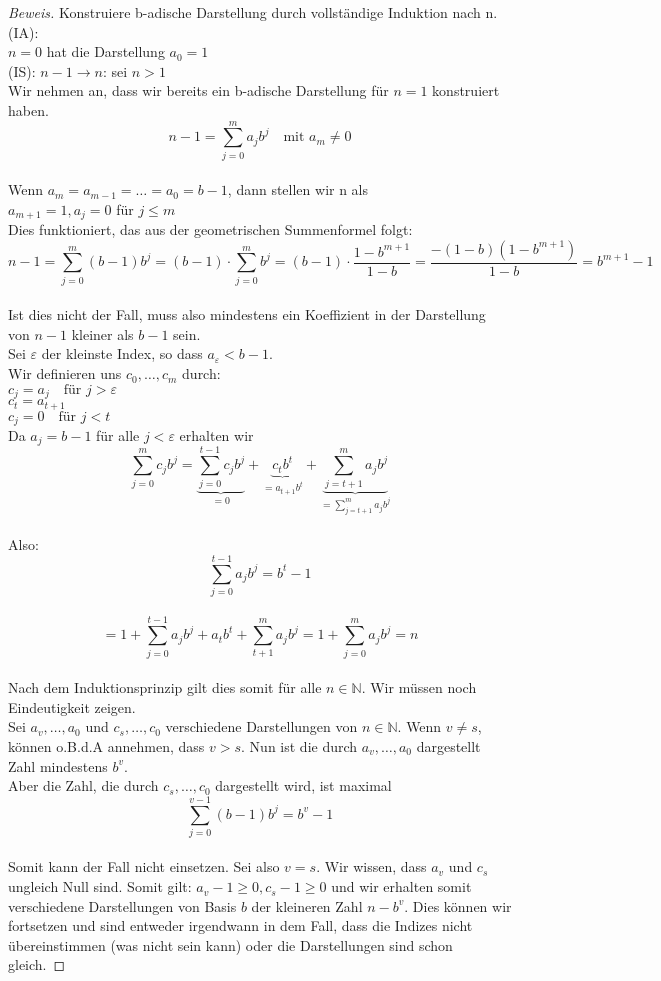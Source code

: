 \documentclass[12pt,a4paper,titlepage]{article} %
\theoremstyle{definition}
\theoremstyle{remark}
\newenvironment{bew}{\begin{proof}[Beweis]}{\end{proof}}
\newcommand{\N}{\mathbb{N}}
\begin{document}
	\begin{bew}
		Konstruiere b-adische Darstellung durch vollständige Induktion nach n.\\
		(IA):\\
		\(n = 0\) hat die Darstellung \(a_0 = 1\)\\
		(IS): \(n - 1 \rightarrow n\): sei \(n > 1\)\\
		Wir nehmen an, dass wir bereits ein b-adische Darstellung für \(n = 1\) konstruiert haben.\\
		\[n-1 = \sum_{j=0}^{m} a_jb^j \quad \text{mit } a_m \neq 0\]\\
		Wenn \(a_m = a_{m-1} = \dots = a_0 = b-1\), dann stellen wir n als\\
		\(a_{m+1} = 1, a_j = 0\) für \(j \leq m\)\\
		Dies funktioniert, das aus der geometrischen Summenformel folgt:\\
		\[n-1 = \sum_{j=0}^{m} (b-1)b^j = (b-1) \cdot \sum_{j=0}^{m}b^j = (b-1) \cdot \frac{1- b^{m+1}}{1-b} = \frac{-(1-b)(1-b^{m+1})}{1-b} = b^{m+1}-1\]\\
		Ist dies nicht der Fall, muss also mindestens ein Koeffizient in der Darstellung von \(n-1\) kleiner als \(b-1\) sein.\\
		Sei \(\varepsilon\) der kleinste Index, so dass \(a_{\varepsilon} < b-1\).\\
		Wir definieren uns \(c_0, \dots, c_m\) durch:\\
		\(c_j = a_j \quad \text{für } j > \varepsilon\)\\
		\(c_t = a_{t+1}\)\\
		\(c_j = 0 \quad \text{für } j < t\)\\
		Da \(a_j = b-1\) für alle \(j<\varepsilon\) erhalten wir\\
		\[\sum_{j=0}^{m} c_jb^j = \underbrace{\sum_{j=0}^{t-1} c_jb^j}_{=0} + \underbrace{c_tb^t}_{=a_{t+1}b^t} + \underbrace{\sum_{j=t+1}^{m} a_jb^j}_{=\sum_{j=t+1}^{m} a_jb^j}\]\\
		Also:
		\[\sum_{j=0}^{t-1} a_jb^j = b^t-1\]\\
		\[= 1+\sum_{j=0}^{t-1} a_jb^j + a_tb^t + \sum_{t+1}^{m}a_jb^j = 1+\sum_{j=0}^{m} a_jb^j = n\]\\
		Nach dem Induktionsprinzip gilt dies somit für alle \(n \in \N\). Wir müssen noch Eindeutigkeit zeigen.\\
		Sei \(a_v,\dots, a_0\) und \(c_s,\dots, c_0\) verschiedene Darstellungen von \(n \in \N\). Wenn \(v \neq s\), können o.B.d.A annehmen, dass \(v > s\). Nun ist die durch \(a_v,\dots, a_0\) dargestellt Zahl mindestens \(b^v\).\\
		Aber die Zahl, die durch \(c_s,\dots, c_0\) dargestellt wird, ist maximal\\
		\[\sum_{j=0}^{v-1}(b-1)b^j = b^v - 1\]\\
		Somit kann der Fall nicht einsetzen. Sei also \(v=s\). Wir wissen, dass \(a_v\) und \(c_s\) ungleich Null sind. Somit gilt: \(a_v - 1 \geq 0, c_s - 1 \geq 0\) und wir erhalten somit verschiedene Darstellungen von Basis \(b\) der kleineren Zahl \(n-b^v\). Dies können wir fortsetzen und sind entweder irgendwann in dem Fall, dass die Indizes nicht übereinstimmen (was nicht sein kann) oder die Darstellungen sind schon gleich.
	\end{bew}
\end{document}
